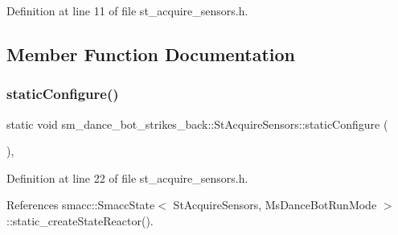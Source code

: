 Definition at line 11 of file st\+\_\+acquire\+\_\+sensors.\+h.



\subsection{Member Function Documentation}
\mbox{\label{structsm__dance__bot__strikes__back_1_1StAcquireSensors_a83de29e9c8ce05f82c487b91255f9fe1}} 
\subsubsection{\texorpdfstring{static\+Configure()}{staticConfigure()}}
{\footnotesize\ttfamily static void sm\+\_\+dance\+\_\+bot\+\_\+strikes\+\_\+back\+::\+St\+Acquire\+Sensors\+::static\+Configure (\begin{DoxyParamCaption}{ }\end{DoxyParamCaption})\hspace{0.3cm}{\ttfamily [inline]}, {\ttfamily [static]}}



Definition at line 22 of file st\+\_\+acquire\+\_\+sensors.\+h.



References smacc\+::\+Smacc\+State$<$ St\+Acquire\+Sensors, Ms\+Dance\+Bot\+Run\+Mode $>$\+::static\+\_\+create\+State\+Reactor().



